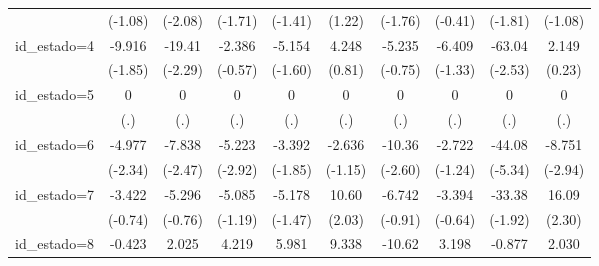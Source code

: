 {\begin{tabular}{l*{9}{c}}
                    &     (-1.08)         &     (-2.08)         &     (-1.71)         &     (-1.41)         &      (1.22)         &     (-1.76)         &     (-0.41)         &     (-1.81)         &     (-1.08)         \\
[1em]
id\_estado=4         &      -9.916         &      -19.41\sym{*}  &      -2.386         &      -5.154         &       4.248         &      -5.235         &      -6.409         &      -63.04\sym{*}  &       2.149         \\
                    &     (-1.85)         &     (-2.29)         &     (-0.57)         &     (-1.60)         &      (0.81)         &     (-0.75)         &     (-1.33)         &     (-2.53)         &      (0.23)         \\
[1em]
id\_estado=5         &           0         &           0         &           0         &           0         &           0         &           0         &           0         &           0         &           0         \\
                    &         (.)         &         (.)         &         (.)         &         (.)         &         (.)         &         (.)         &         (.)         &         (.)         &         (.)         \\
[1em]
id\_estado=6         &      -4.977\sym{*}  &      -7.838\sym{*}  &      -5.223\sym{**} &      -3.392         &      -2.636         &      -10.36\sym{**} &      -2.722         &      -44.08\sym{***}&      -8.751\sym{**} \\
                    &     (-2.34)         &     (-2.47)         &     (-2.92)         &     (-1.85)         &     (-1.15)         &     (-2.60)         &     (-1.24)         &     (-5.34)         &     (-2.94)         \\
[1em]
id\_estado=7         &      -3.422         &      -5.296         &      -5.085         &      -5.178         &       10.60\sym{*}  &      -6.742         &      -3.394         &      -33.38         &       16.09\sym{*}  \\
                    &     (-0.74)         &     (-0.76)         &     (-1.19)         &     (-1.47)         &      (2.03)         &     (-0.91)         &     (-0.64)         &     (-1.92)         &      (2.30)         \\
[1em]
id\_estado=8         &      -0.423         &       2.025         &       4.219         &       5.981\sym{**} &       9.338\sym{**} &      -10.62\sym{*}  &       3.198         &      -0.877         &       2.030         \\

\end{tabular}}

